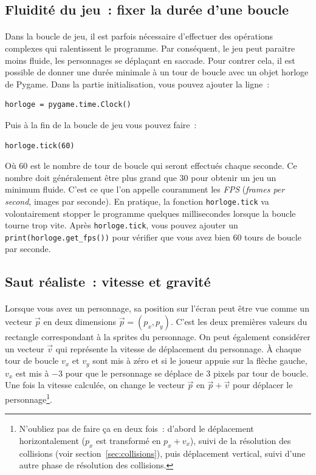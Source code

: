 \subsection{Fluidité du jeu~: fixer la durée d'une boucle}
\label{sec:fps}

\paragraph{}
Dans la boucle de jeu, il est parfois nécessaire d'effectuer des opérations complexes qui ralentissent le programme.
Par conséquent, le jeu peut paraitre moins fluide, les personnages se déplaçant en saccade.
Pour contrer cela, il est possible de donner une durée minimale à un tour de boucle avec un objet horloge de Pygame.
Dans la partie initialisation, vous pouvez ajouter la ligne~:
\begin{verbatim}
horloge = pygame.time.Clock()
\end{verbatim}
Puis à la fin de la boucle de jeu vous pouvez faire~:
\begin{verbatim}
horloge.tick(60)
\end{verbatim}
Où 60 est le nombre de tour de boucle qui seront effectués chaque seconde.
Ce nombre doit généralement être plus grand que 30 pour obtenir un jeu un minimum fluide.
C'est ce que l'on appelle couramment les \emph{FPS} (\emph{frames per second}, images par seconde).
En pratique, la fonction \texttt{horloge.tick} va volontairement stopper le programme quelques millisecondes lorsque la boucle tourne trop vite.
Après \texttt{horloge.tick}, vous pouvez ajouter un \texttt{print(horloge.get\_fps())} pour vérifier que vous avez bien 60 tours de boucle par seconde.

\subsection{Saut réaliste~: vitesse et gravité}
\label{sec:gravite}

\paragraph{}
Lorsque vous avez un personnage, sa position sur l'écran peut être vue comme un vecteur \(\vec{p}\) en deux dimensions \(\vec{p} = (p_x, p_y)\).
C'est les deux premières valeurs du rectangle correspondant à la sprites du personnage.
On peut également considérer un vecteur \(\vec{v}\) qui représente la vitesse de déplacement du personnage.
À chaque tour de boucle \(v_x\) et \(v_y\) sont mis à zéro et si le joueur appuie sur la flèche gauche, \(v_x\) est mis à \(-3\) pour que le personnage se déplace de 3 pixels par tour de boucle.
Une fois la vitesse calculée, on change le vecteur \(\vec{p}\) en \(\vec{p}+\vec{v}\) pour déplacer le personnage\footnote{N'oubliez pas de faire ça en deux fois~: d'abord le déplacement horizontalement (\(p_x\) est transformé en \(p_x + v_x\)), suivi de la résolution des collisions (voir section~\ref{sec:collisions}), puis déplacement vertical, suivi d'une autre phase de résolution des collisions.}.

